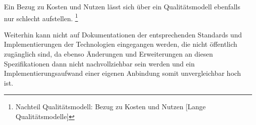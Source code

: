 		Ein Bezug zu Kosten und Nutzen lässt sich über ein Qualitätsmodell ebenfalls nur schlecht aufstellen. \footnote{Nachteil Qualitätsmodell: Bezug zu Kosten und Nutzen [Lange Qualitätsmodelle]}
		
		Weiterhin kann nicht auf Dokumentationen der entsprechenden Standards und Implementierungen der Technologien eingegangen werden, die nicht öffentlich zugänglich sind, da ebenso Änderungen und Erweiterungen an diesen Spezifikationen dann nicht nachvollziehbar sein werden und ein Implementierungsaufwand einer eigenen Anbindung somit unvergleichbar hoch ist.
		
		
